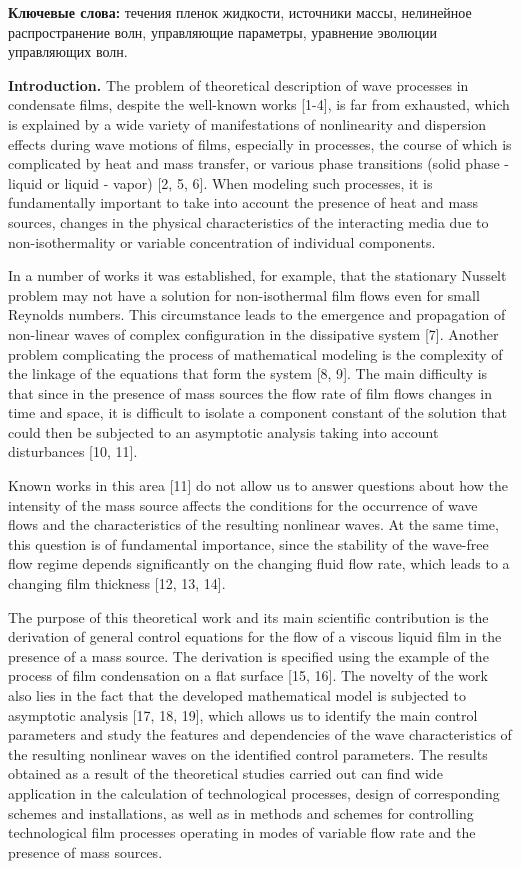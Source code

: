 {\bfseries Ключевые слова:} течения пленок жидкости, источники массы,
нелинейное распространение волн, управляющие параметры, уравнение
эволюции управляющих волн.

\begin{multicols}{2}
{\bfseries Introduction.} The problem of theoretical description of wave
processes in condensate films, despite the well-known works {[}1-4{]},
is far from exhausted, which is explained by a wide variety of
manifestations of nonlinearity and dispersion effects during wave
motions of films, especially in processes, the course of which is
complicated by heat and mass transfer, or various phase transitions
(solid phase - liquid or liquid - vapor) {[}2, 5, 6{]}. When modeling
such processes, it is fundamentally important to take into account the
presence of heat and mass sources, changes in the physical
characteristics of the interacting media due to non-isothermality or
variable concentration of individual components.

In a number of works it was established, for example, that the
stationary Nusselt problem may not have a solution for non-isothermal
film flows even for small Reynolds numbers. This circumstance leads to
the emergence and propagation of non-linear waves of complex
configuration in the dissipative system {[}7{]}. Another problem
complicating the process of mathematical modeling is the complexity of
the linkage of the equations that form the system {[}8, 9{]}. The main
difficulty is that since in the presence of mass sources the flow rate
of film flows changes in time and space, it is difficult to isolate a
component constant of the solution that could then be subjected to an
asymptotic analysis taking into account disturbances {[}10, 11{]}.

Known works in this area {[}11{]} do not allow us to answer questions
about how the intensity of the mass source affects the conditions for
the occurrence of wave flows and the characteristics of the resulting
nonlinear waves. At the same time, this question is of fundamental
importance, since the stability of the wave-free flow regime depends
significantly on the changing fluid flow rate, which leads to a changing
film thickness {[}12, 13, 14{]}.

The purpose of this theoretical work and its main scientific
contribution is the derivation of general control equations for the flow
of a viscous liquid film in the presence of a mass source. The
derivation is specified using the example of the process of film
condensation on a flat surface {[}15, 16{]}. The novelty of the work
also lies in the fact that the developed mathematical model is subjected
to asymptotic analysis {[}17, 18, 19{]}, which allows us to identify the
main control parameters and study the features and dependencies of the
wave characteristics of the resulting nonlinear waves on the identified
control parameters. The results obtained as a result of the theoretical
studies carried out can find wide application in the calculation of
technological processes, design of corresponding schemes and
installations, as well as in methods and schemes for controlling
technological film processes operating in modes of variable flow rate
and the presence of mass sources.


\end{multicols}
